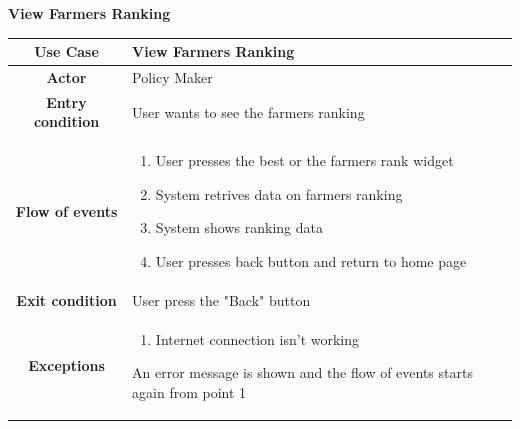 \documentclass[table, 12pt]{article}
\begin{document}
\begin{itemize}
            \begin{table}[H]
                \item[] \textbf{View Farmers Ranking}
                \item[] 
                \centering
                \begin{tabular}{|c| m{}|}
                    \hline
                    \textbf{Use Case} & View Farmers Ranking\\ \hline
                    \textbf{Actor} & Policy Maker\\ \hline
                    \textbf{Entry condition} & User wants to see the farmers ranking\\  \hline
                    \textbf{Flow of events} & \begin{enumerate}
                                                \item User presses the best or the farmers rank widget
                                                \item System retrives data on farmers ranking
                                                \item System shows ranking data
                                                \item User presses back button and return to home page
                                            \end{enumerate}\\ \hline
                    \textbf{Exit condition} & User press the "Back" button\\ \hline
                    \textbf{Exceptions} &  \begin{enumerate}
                        \item Internet connection isn't working
                    \end{enumerate}
                    An error message is shown and the flow of events starts again from point 1\\ \hline                    
                \end{tabular}
            \end{table}


\end{itemize}
\end{document}

